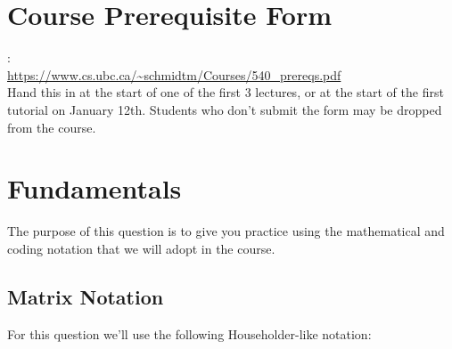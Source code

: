 \documentclass{article}
\begin{document}
\setcounter{section}{-1}
\section{Course Prerequisite Form}

:\\
\url{https://www.cs.ubc.ca/~schmidtm/Courses/540_prereqs.pdf}\\
Hand this in at the start of one of the first 3 lectures, or at the start of the first tutorial on January 12th. Students who don't submit the form may be dropped from the course.

\section{Fundamentals}

The purpose of this question is to give you practice using the mathematical and coding notation that we will adopt in the course.

\subsection{Matrix Notation}

For this question we'll use the following Householder-like notation:
\end{document}
